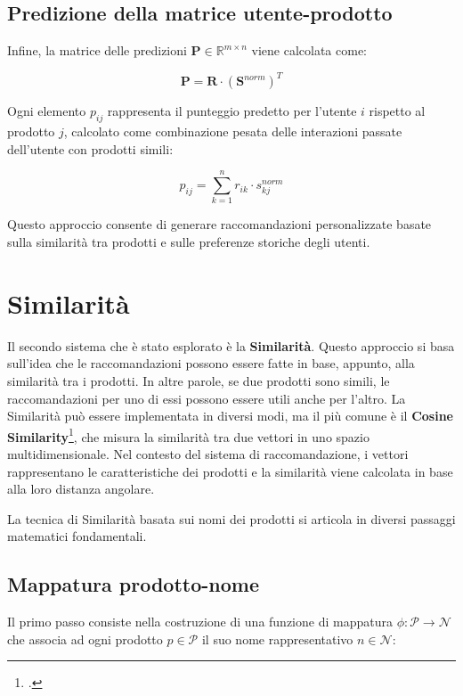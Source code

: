 \subsection{Predizione della matrice utente-prodotto}

Infine, la matrice delle predizioni $\mathbf{P} \in \mathbb{R}^{m \times n}$ viene calcolata come:

\begin{equation}
\mathbf{P} = \mathbf{R} \cdot (\mathbf{S}^{norm})^T
\end{equation}

Ogni elemento $p_{ij}$ rappresenta il punteggio predetto per l'utente $i$ rispetto al prodotto $j$, calcolato come combinazione pesata delle interazioni passate dell'utente con prodotti simili:

\begin{equation}
p_{ij} = \sum_{k=1}^{n} r_{ik} \cdot s_{kj}^{norm}
\end{equation}

Questo approccio consente di generare raccomandazioni personalizzate basate sulla similarità tra prodotti e sulle preferenze storiche degli utenti.


\section{Similarità}

Il secondo sistema che è stato esplorato è la \textbf{Similarità}. Questo approccio si basa sull'idea che le raccomandazioni possono essere fatte in base, appunto, alla similarità tra i prodotti. In altre parole, se due prodotti sono simili, le raccomandazioni per uno di essi possono essere utili anche per l'altro. La Similarità può essere implementata in diversi modi, ma il più comune è il \textbf{Cosine Similarity}\footcite{site:cosine-similarity}, che misura la similarità tra due vettori in uno spazio multidimensionale. Nel contesto del sistema di raccomandazione, i vettori rappresentano le caratteristiche dei prodotti e la similarità viene calcolata in base alla loro distanza angolare.

La tecnica di Similarità basata sui nomi dei prodotti si articola in diversi passaggi matematici fondamentali.

\subsection{Mappatura prodotto-nome}

Il primo passo consiste nella costruzione di una funzione di mappatura $\phi: \mathcal{P} \rightarrow \mathcal{N}$ che associa ad ogni prodotto $p \in \mathcal{P}$ il suo nome rappresentativo $n \in \mathcal{N}$:

